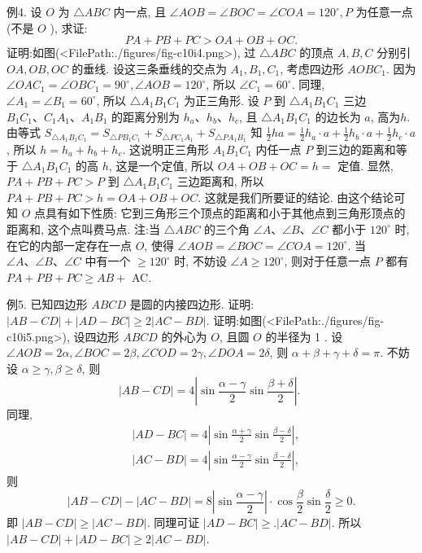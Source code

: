 例4.  设 $O$ 为 $\triangle A B C$ 内一点, 且 $\angle A O B=\angle B O C=\angle C O A=120^{\circ}, P$ 为任意一点 (不是 $O$ ), 求证:
$$
P A+P B+P C>O A+O B+O C .
$$
证明:如图(<FilePath:./figures/fig-c10i4.png>), 过 $\triangle A B C$ 的顶点 $A, B, C$ 分别引 $O A, O B, O C$ 的垂线.
设这三条垂线的交点为 $A_1, B_1, C_1$, 考虑四边形 $A O B C_1$. 因为 $\angle O A C_1=\angle O B C_1=90^{\circ}, \angle A O B= 120^{\circ}$, 所以 $\angle C_1=60^{\circ}$. 同理, $\angle A_1=\angle B_1=60^{\circ}$, 所以 $\triangle A_1 B_1 C_1$ 为正三角形.
设 $P$ 到 $\triangle A_1 B_1 C_1$ 三边 $B_1 C_1 、 C_1 A_1 、 A_1 B_1$ 的距离分别为 $h_a 、 h_b 、 h_c$, 且 $\triangle A_1 B_1 C_1$ 的边长为 $a$, 高为$h$. 由等式 $S_{\triangle A_1 B_1 C_1}=S_{\triangle P B_1 C_1}+S_{\triangle P C_1 A_1}+S_{\triangle P A_1 B_1}$ 知 $\frac{1}{2} h a=\frac{1}{2} h_a \cdot a+\frac{1}{2} h_b \cdot a+\frac{1}{2} h_c \cdot a$, 所以 $h=h_a+ h_b+h_c$.
这说明正三角形 $A_1 B_1 C_1$ 内任一点 $P$ 到三边的距离和等于 $\triangle A_1 B_1 C_1$ 的高 $h$, 这是一个定值, 所以 $O A+O B+O C=h=$ 定值.
显然, $P A+P B+ P C>P$ 到 $\triangle A_1 B_1 C_1$ 三边距离和, 所以 $P A+P B+P C>h=O A+O B+ O C$. 这就是我们所要证的结论.
由这个结论可知 $O$ 点具有如下性质: 它到三角形三个顶点的距离和小于其他点到三角形顶点的距离和, 这个点叫费马点.
注:当 $\triangle A B C$ 的三个角 $\angle A 、 \angle B 、 \angle C$ 都小于 $120^{\circ}$ 时, 在它的内部一定存在一点 $O$, 使得 $\angle A O B=\angle B O C=\angle C O A=120^{\circ}$. 当 $\angle A 、 \angle B 、 \angle C$ 中有一个 $\geqslant 120^{\circ}$ 时, 不妨设 $\angle A \geqslant 120^{\circ}$, 则对于任意一点 $P$ 都有 $P A+P B+P C \geqslant A B+$ AC.



例5. 已知四边形 $A B C D$ 是圆的内接四边形.
证明: $|A B-C D|+|A D-B C| \geqslant 2|A C-B D|$.
证明:如图(<FilePath:./figures/fig-c10i5.png>), 设四边形 $A B C D$ 的外心为 $O$, 且圆 $O$ 的半径为 1 .
设 $\angle A O B=2 \alpha, \angle B O C=2 \beta, \angle C O D=2 \gamma, \angle D O A=2 \delta$, 则 $\alpha+\beta+\gamma+\delta=\pi$.
不妨设 $\alpha \geqslant \gamma, \beta \geqslant \delta$, 则
$$
|A B-C D|=4\left|\sin \frac{\alpha-\gamma}{2} \sin \frac{\beta+\delta}{2}\right| \text {. }
$$
同理,
$$
\begin{aligned}
& |A D-B C|=4\left|\sin \frac{\alpha+\gamma}{2} \sin \frac{\beta-\delta}{2}\right|, \\
& |A C-B D|=4\left|\sin \frac{\alpha-\gamma}{2} \sin \frac{\beta-\delta}{2}\right|,
\end{aligned}
$$
则
$$
|A B-C D|-|A C-B D|=8\left|\sin \frac{\alpha-\gamma}{2}\right| \cdot \cos \frac{\beta}{2} \sin \frac{\delta}{2} \geqslant 0 .
$$
即 $|A B-C D| \geqslant|A C-B D|$. 同理可证 $|A D-B C| \geqslant.|A C-B D|$.
所以 $|A B-C D|+|A D-B C| \geqslant 2|A C-B D|$.



